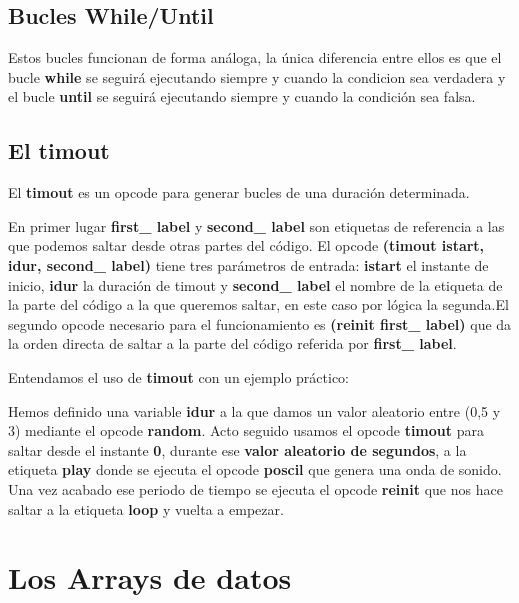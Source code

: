 \subsection{Bucles While/Until}


Estos bucles funcionan de forma análoga, la única diferencia entre ellos es que el bucle \textbf{while} se seguirá ejecutando siempre y cuando la condicion sea verdadera y el bucle \textbf{until} se seguirá ejecutando siempre y cuando la condición sea falsa.

\subsection{El timout}

El \textbf{timout} es un opcode para generar bucles de una duración determinada. 


En primer lugar \textbf{first\_ label} y \textbf{second\_ label} son etiquetas de referencia a las que podemos saltar desde otras partes del código. El opcode \textbf{(timout    istart, idur, second\_ label)} tiene tres parámetros de entrada: \textbf{istart} el instante de inicio, \textbf{idur} la duración de timout y \textbf{second\_ label} el nombre de la etiqueta de la parte del código a la que queremos saltar, en este caso por lógica la segunda.El segundo opcode necesario para el funcionamiento es \textbf{(reinit	first\_ label)} que da la orden directa de saltar a la parte del código referida por \textbf{first\_ label}.

Entendamos el uso de \textbf{timout} con un ejemplo práctico:


Hemos definido una variable \textbf{idur} a la que damos un valor aleatorio entre (0,5 y 3) mediante el opcode \textbf{random}. Acto seguido usamos el opcode \textbf{timout} para saltar desde el instante \textbf{0}, durante ese \textbf{valor aleatorio de segundos}, a la etiqueta \textbf{play} donde se ejecuta el opcode \textbf{poscil} que genera una onda de sonido. Una vez acabado ese periodo de tiempo se ejecuta el opcode \textbf{reinit} que nos hace saltar a la etiqueta \textbf{loop} y vuelta a empezar.

\section{Los Arrays de datos}

